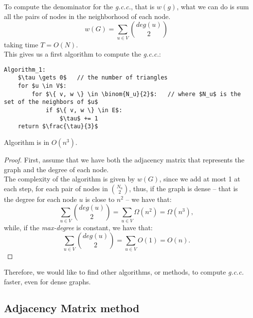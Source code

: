 To compute the denominator for the \emph{g.c.c.}, that is $w(g)$, what we can do is sum all the pairs of nodes in the neighborhood of each node.
\[
	w(G) = \sum_{u \in V}\binom{deg(u)}{2}
\]
taking time $T = O(N)$.\\
This gives us a first algorithm to compute the \emph{g.c.c.}:
%
\begin{lstlisting}[caption={Algorithm 1}, label={lst:triangles-alg1}]
Algorithm_1:
    $\tau \gets 0$   // the number of triangles
    for $u \in V$:
        for $\{ v, w \} \in \binom{N_u}{2}$:   // where $N_u$ is the set of the neighbors of $u$
            if $\{ v, w \} \in E$:
                $\tau$ += 1
    return $\frac{\tau}{3}$
\end{lstlisting}
%
\begin{claim}\label{cl:triangles-1}
	Algorithm is in $O(n^3)$.
\end{claim}
\begin{proof}
    First, assume that we have both the adjacency matrix that represents the graph and the degree of each node.\\
    The complexity of the algorithm is given by $w(G)$, since we add at most 1 at each step, for each pair of nodes in $\binom{N_u}{2}$, thus,
	if the graph is dense -- that is the degree for each node $u$ is close to $n^2$ -- we have that:
	\[
		\sum_{u \in V}\binom{deg(u)}{2} = \sum_{u \in V}\Omega(n^2) = \Omega(n^3),
	\]
	while, if the \textit{max-degree} is constant, we have that:
	\[
		\sum_{u \in V}\binom{deg(u)}{2} = \sum_{u \in V} O(1) = O(n).
	\]
\end{proof}

Therefore, we would like to find other algorithms, or methods, to compute \textit{g.c.c.} faster, even for dense graphs.


\subsection{Adjacency Matrix method}\label{sec:triangles-adjacency}

